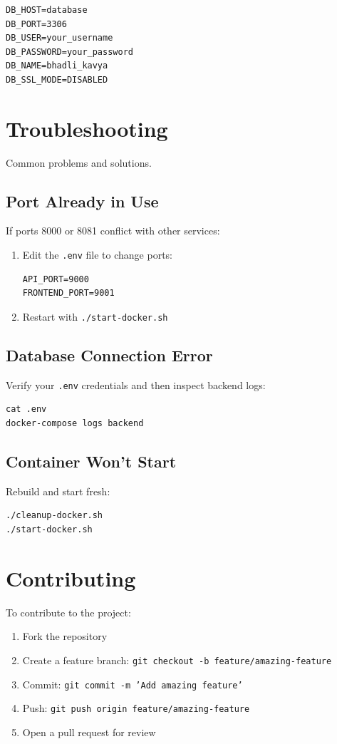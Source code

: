 \documentclass[11pt]{article}
\begin{document}
\begin{Verbatim}[fontsize=\small]
DB_HOST=database
DB_PORT=3306
DB_USER=your_username
DB_PASSWORD=your_password
DB_NAME=bhadli_kavya
DB_SSL_MODE=DISABLED
\end{Verbatim}

\section{Troubleshooting}
Common problems and solutions.

\subsection{Port Already in Use}
If ports 8000 or 8081 conflict with other services:
\begin{enumerate}
	\item Edit the \texttt{.env} file to change ports:
\begin{Verbatim}[fontsize=\small]
API_PORT=9000
FRONTEND_PORT=9001
\end{Verbatim}
	\item Restart with \texttt{./start-docker.sh}
\end{enumerate}

\subsection{Database Connection Error}
Verify your \texttt{.env} credentials and then inspect backend logs:
\begin{Verbatim}[fontsize=\small]
cat .env
docker-compose logs backend
\end{Verbatim}

\subsection{Container Won't Start}
Rebuild and start fresh:
\begin{Verbatim}[fontsize=\small]
./cleanup-docker.sh
./start-docker.sh
\end{Verbatim}

\section{Contributing}
To contribute to the project:
\begin{enumerate}
	\item Fork the repository
	\item Create a feature branch: \texttt{git checkout -b feature/amazing-feature}
	\item Commit: \texttt{git commit -m 'Add amazing feature'}
	\item Push: \texttt{git push origin feature/amazing-feature}
	\item Open a pull request for review
\end{enumerate}
\end{document}
